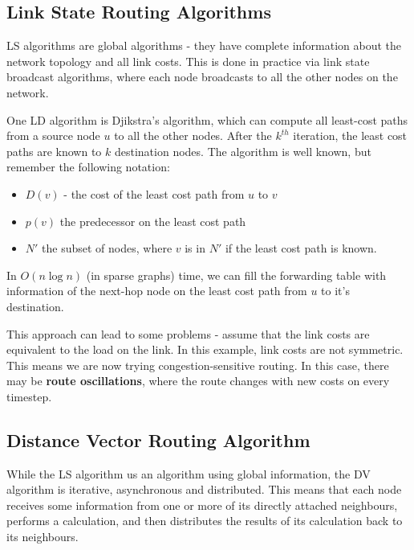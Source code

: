 \documentclass[12pt,letterpaper]{book}
\theoremstyle{definition}
\begin{document}
\subsection{Link State Routing Algorithms}

LS algorithms are global algorithms - they have complete information about the network topology and all link costs. This is done in practice via link state broadcast algorithms, where each node broadcasts to all the other nodes on the network.

One LD algorithm is Djikstra's algorithm, which can compute all least-cost paths from a source node $u$ to all the other nodes. After the $k^{th}$ iteration, the least cost paths are known to $k$ destination nodes. The algorithm is well known, but remember the following notation:
\begin{itemize}
  \item $D(v)$ - the cost of the least cost path from $u$ to $v$
  \item $p(v)$ the predecessor on the least cost path
  \item $N'$ the subset of nodes, where $v$ is in $N'$ if the least cost path is known.
\end{itemize}

In $O(n \log n)$ (in sparse graphs) time, we can fill the forwarding table with information of the next-hop node on the least cost path from $u$ to it's destination.

This approach can lead to some problems - assume that the link costs are equivalent to the load on the link. In this example, link costs are not symmetric. This means we are now trying congestion-sensitive routing. In this case, there may be \textbf{route oscillations}, where the route changes with new costs on every timestep.

\subsection{Distance Vector Routing Algorithm}

While the LS algorithm us an algorithm using global information, the DV algorithm is iterative, asynchronous and distributed. This means that each node receives some information from one or more of its directly attached neighbours, performs a calculation, and then distributes the results of its calculation back to its neighbours.
\end{document}
